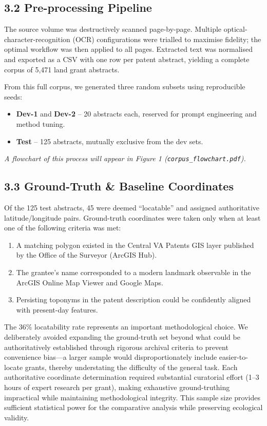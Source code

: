 \documentclass[
  11pt,
]{article}
\providecommand{\tightlist}{%
  \setlength{\itemsep}{0pt}\setlength{\parskip}{0pt}}
\begin{document}
\subsection{3.2 Pre-processing Pipeline}\label{pre-processing-pipeline}

The source volume was destructively scanned page-by-page. Multiple
optical-character-recognition (OCR) configurations were trialled to
maximise fidelity; the optimal workflow was then applied to all pages.
Extracted text was normalised and exported as a CSV with one row per
patent abstract, yielding a complete corpus of 5,471 land grant
abstracts.

From this full corpus, we generated three random subsets using
reproducible seeds:

\begin{itemize}
\tightlist
\item
  \textbf{Dev-1} and \textbf{Dev-2} -- 20 abstracts each, reserved for
  prompt engineering and method tuning.
\item
  \textbf{Test} -- 125 abstracts, mutually exclusive from the dev sets.
\end{itemize}

\emph{A flowchart of this process will appear in Figure 1
(\texttt{corpus\_flowchart.pdf}).}

\subsection{3.3 Ground-Truth \& Baseline
Coordinates}\label{ground-truth-baseline-coordinates}

Of the 125 test abstracts, 45 were deemed ``locatable'' and assigned
authoritative latitude/longitude pairs. Ground-truth coordinates were
taken only when at least one of the following criteria was met:

\begin{enumerate}
\def\labelenumi{\arabic{enumi}.}
\tightlist
\item
  A matching polygon existed in the Central VA Patents GIS layer
  published by the Office of the Surveyor (ArcGIS Hub).
\item
  The grantee's name corresponded to a modern landmark observable in the
  ArcGIS Online Map Viewer and Google Maps.
\item
  Persisting toponyms in the patent description could be confidently
  aligned with present-day features.
\end{enumerate}

The 36\% locatability rate represents an important methodological
choice. We deliberately avoided expanding the ground-truth set beyond
what could be authoritatively established through rigorous archival
criteria to prevent convenience bias---a larger sample would
disproportionately include easier-to-locate grants, thereby understating
the difficulty of the general task. Each authoritative coordinate
determination required substantial curatorial effort (1--3 hours of
expert research per grant), making exhaustive ground-truthing
impractical while maintaining methodological integrity. This sample size
provides sufficient statistical power for the comparative analysis while
preserving ecological validity.
\end{document}
